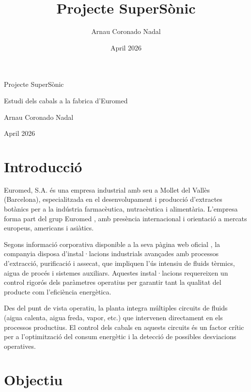 \documentclass[12pt]{article}
\title{Projecte SuperSònic}
\author{Arnau Coronado Nadal}
\date{April 2026}
\begin{document}
\begin{center}
\vspace*{3cm}

{\Huge Projecte SuperSònic}

\vspace{1cm}
{\Large Estudi dels cabals a la fabrica d'Euromed}

\vspace{2cm}
{\large Arnau Coronado Nadal}

\vspace{1cm}
{\normalsize April 2026}
\end{center}

\thispagestyle{emptystyle}
\newpage

\thispagestyle{emptystyle}
\renewcommand{\contentsname}{Taula de continguts}
\tableofcontents
\newpage


\section{Introducció}

Euromed, S.A. és una empresa industrial amb seu a Mollet del Vallès (Barcelona), especialitzada en el desenvolupament i producció d'extractes botànics per a la indústria farmacèutica, nutracèutica i alimentària. 
L'empresa forma part del grup Euromed \cite{Euromed2024}, amb presència internacional i orientació a mercats europeus, americans i asiàtics.

Segons informació corporativa disponible a la seva pàgina web oficial \cite{Euromed2024}, la companyia disposa d'instal·lacions industrials avançades amb processos d'extracció, purificació i assecat, que impliquen l'ús intensiu de fluids tèrmics, aigua de procés i sistemes auxiliars. Aquestes 
instal·lacions requereixen un control rigorós dels paràmetres operatius per garantir tant la qualitat del producte com l'eficiència energètica.

Des del punt de vista operatiu, la planta integra múltiples circuits de fluids (aigua calenta, aigua freda, vapor, etc.) que intervenen directament en els processos productius. El control dels cabals en aquests circuits és un factor crític per a l'optimització del consum energètic i la detecció de possibles desviacions operatives.

\section{Objectiu}
\end{document}
